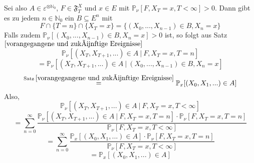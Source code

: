 Sei also $ A \in \varepsilon^{ \otimes \mathbb{N}_{0}}$, $F \in \mathfrak{F}_{T}^{X}$ und $x \in E$ mit $\mathbb{P}_{\nu}[F, X_{T} = x, T < \infty] > 0$. Dann gibt es zu jedem $n \in \mathbb{N}_{0}$ ein $B \subseteq E^{n}$ mit
\begin{equation*}
F \cap \lbrace T = n \rbrace \cap \lbrace X_{T} = x \rbrace = \lbrace (X_{0},...,X_{n-1}) \in B, X_{n} = x \rbrace
\end{equation*}
Falls zudem $\mathbb{P}_{\nu}[(X_{0},...,X_{n-1}) \in B, X_{n} = x] > 0$ ist, so folgt aus Satz $\ref{vorangegangene und zukünftige Ereignisse}$
\begin{equation*}
\mathbb{P}_{\nu}[(X_{T},X_{T+1},...) \in A \: | \: F, X_{T} = x, T = n]
\end{equation*}
\begin{equation*}
= \mathbb{P}_{\nu}[(X_{T},X_{T+1},...) \in A \: | \: (X_{0},...,X_{n-1}) \in B, X_{n} = x]
\end{equation*}
\begin{equation*}
\stackrel{\mathrm{Satz} \: \ref{vorangegangene und zukünftige Ereignisse}}{=} \mathbb{P}_{x}[(X_{0},X_{1},...) \in A]
\end{equation*}
Also,
\begin{equation*}
\mathbb{P}_{\nu}[(X_{T},X_{T+1},...) \in A \: | \: F, X_{T} = x, T < \infty]
\end{equation*}
\begin{equation*}
= \sum_{n=0}^{\infty} \dfrac{\mathbb{P}_{\nu}[(X_{T},X_{T+1},...) \in A \: | \: F, X_{T} = x, T = n] \cdot \mathbb{P}_{\nu}[F, X_{T} = x, T = n]}{ \mathbb{P}_{\nu}[F, X_{T} = x, T < \infty]} 
\end{equation*}
\begin{equation*}
= \sum_{n=0}^{\infty} \dfrac{\mathbb{P}_{x}[(X_{0},X_{1},...) \in A] \cdot \mathbb{P}_{\nu}[F, X_{T} = x, T = n]}{ \mathbb{P}_{\nu}[F, X_{T} = x, T < \infty]} 
\end{equation*}
\begin{equation*}
= \mathbb{P}_{x}[(X_{0},X_{1},...) \in A]
\end{equation*}